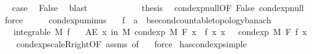 \begin{isabellebody}
\ \isamarkupfalse%
\ {\isacharquery}{\kern0pt}case\ \isamarkupfalse%
\ False\ \isamarkupfalse%
\ blast\isanewline
\ \ \ \ \isamarkupfalse%
\isanewline
\ \ \ \ \isamarkupfalse%
\ \isamarkupfalse%
\ {\isacharquery}{\kern0pt}thesis\ \isamarkupfalse%
\ cond{\isacharunderscore}{\kern0pt}exp{\isacharunderscore}{\kern0pt}null{\isacharbrackleft}{\kern0pt}OF\ False{\isacharbrackright}{\kern0pt}\ cond{\isacharunderscore}{\kern0pt}exp{\isacharunderscore}{\kern0pt}null\ \isamarkupfalse%
\ force\isanewline
\ \ \isamarkupfalse%
\ \isanewline
{}\isamarkupfalse%
%
\endisatagproof
{\isafoldproof}%
%
\isadelimproof
\isanewline
%
\endisadelimproof
\isanewline
{}\isamarkupfalse%
\ cond{\isacharunderscore}{\kern0pt}exp{\isacharunderscore}{\kern0pt}uminus{\isacharcolon}{\kern0pt}\isanewline
\ \ \ f\ {\isacharcolon}{\kern0pt}{\isacharcolon}{\kern0pt}\ {\isachardoublequoteopen}{\isacharprime}{\kern0pt}a\ {\isasymRightarrow}\ {\isacharprime}{\kern0pt}b{\isacharcolon}{\kern0pt}{\isacharcolon}{\kern0pt}{\isacharbraceleft}{\kern0pt}second{\isacharunderscore}{\kern0pt}countable{\isacharunderscore}{\kern0pt}topology{\isacharcomma}{\kern0pt}banach{\isacharbraceright}{\kern0pt}{\isachardoublequoteclose}\isanewline
\ \ \ {\isachardoublequoteopen}integrable\ M\ f{\isachardoublequoteclose}\isanewline
\ \ \ {\isachardoublequoteopen}AE\ x\ in\ M{\isachardot}{\kern0pt}\ cond{\isacharunderscore}{\kern0pt}exp\ M\ F\ {\isacharparenleft}{\kern0pt}{\isasymlambda}x{\isachardot}{\kern0pt}\ {\isacharminus}{\kern0pt}\ f\ x{\isacharparenright}{\kern0pt}\ x\ {\isacharequal}{\kern0pt}\ {\isacharminus}{\kern0pt}\ cond{\isacharunderscore}{\kern0pt}exp\ M\ F\ f\ x{\isachardoublequoteclose}\isanewline
%
\isadelimproof
\ \ %
\endisadelimproof
%
\isatagproof
{}\isamarkupfalse%
\ cond{\isacharunderscore}{\kern0pt}exp{\isacharunderscore}{\kern0pt}scaleR{\isacharunderscore}{\kern0pt}right{\isacharbrackleft}{\kern0pt}OF\ assms{\isacharcomma}{\kern0pt}\ of\ {\isachardoublequoteopen}{\isacharminus}{\kern0pt}{}{\isachardoublequoteclose}{\isacharbrackright}{\kern0pt}\ \isamarkupfalse%
\ force%
\endisatagproof
{\isafoldproof}%
%
\isadelimproof
\isanewline
%
\endisadelimproof
\isanewline
{}\isamarkupfalse%
\ has{\isacharunderscore}{\kern0pt}cond{\isacharunderscore}{\kern0pt}exp{\isacharunderscore}{\kern0pt}simple{\isacharcolon}{\kern0pt}\isanewline

\end{isabellebody}
